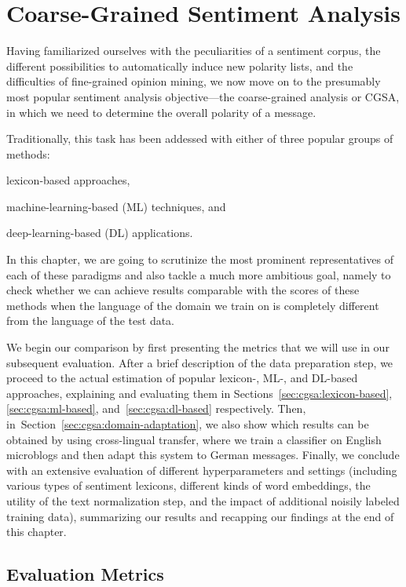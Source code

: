 \chapter{Coarse-Grained Sentiment Analysis}\label{sec:snt:cgsa}

Having familiarized ourselves with the peculiarities of a sentiment
corpus, the different possibilities to automatically induce new
polarity lists, and the difficulties of fine-grained opinion mining,
we now move on to the presumably most popular sentiment analysis
objective---the coarse-grained analysis or CGSA, in which we need to
determine the overall polarity of a message.

Traditionally, this task has been addessed with either of three
popular groups of methods:
\begin{inparaenum}[(i)]
  \item lexicon-based approaches,
  \item machine-learning-based (ML) techniques, and
  \item deep-learning-based (DL) applications.
\end{inparaenum}
In this chapter, we are going to scrutinize the most prominent
representatives of each of these paradigms and also tackle a much more
ambitious goal, namely to check whether we can achieve results
comparable with the scores of these methods when the language of the
domain we train on is completely different from the language of the
test data.

We begin our comparison by first presenting the metrics that we will
use in our subsequent evaluation.  After a brief description of the
data preparation step, we proceed to the actual estimation of popular
lexicon-, ML-, and DL-based approaches, explaining and evaluating them
in Sections~\ref{sec:cgsa:lexicon-based}, \ref{sec:cgsa:ml-based},
and~\ref{sec:cgsa:dl-based} respectively.  Then,
in~Section~\ref{sec:cgsa:domain-adaptation}, we also show which
results can be obtained by using cross-lingual transfer, where we
train a classifier on English microblogs and then adapt this system to
German messages.  Finally, we conclude with an extensive evaluation of
different hyperparameters and settings (including various types of
sentiment lexicons, different kinds of word embeddings, the utility of
the text normalization step, and the impact of additional noisily
labeled training data), summarizing our results and recapping our
findings at the end of this chapter.

\section{Evaluation Metrics}\label{sec:cgsa:eval-metrics}

